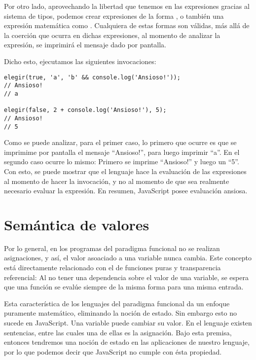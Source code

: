 Por otro lado, aprovechando la libertad que tenemos en las expresiones gracias al sistema de tipos, podemos crear expresiones de la forma , o también una expresión matemática como . Cualquiera de estas formas son válidas, más allá de la coerción que ocurra en dichas expresiones, al momento de analizar la expresión, se imprimirá el mensaje dado por pantalla.

Dicho esto, ejecutamos las siguientes invocaciones:

\begin{lstlisting}[title={Analizando resultados de las invocaciones}]
elegir(true, 'a', 'b' && console.log('Ansioso!'));
// Ansioso!
// a

elegir(false, 2 + console.log('Ansioso!'), 5);
// Ansioso!
// 5
\end{lstlisting}

Como se puede analizar, para el primer caso, lo primero que ocurre es que se imprimime por pantalla el mensaje "`Ansioso!"', para luego imprimir "`a"'. En el segundo caso ocurre lo mismo: Primero se imprime "`Ansioso!"' y luego un "`5"'. Con esto, se puede mostrar que el lenguaje hace la evaluación de las expresiones al momento de hacer la invocación, y no al momento de que sea realmente necesario evaluar la expresión. En resumen, JavaScript posee evaluación ansiosa.

\section{Semántica de valores}

Por lo general, en los programas del paradigma funcional no se realizan asignaciones, y así, el valor asoaciado a una variable nunca cambia. Este concepto está directamente relacionado con el de funciones puras y transparencia referencial: Al no tener una dependencia sobre el valor de una variable, se espera que una función se evalúe siempre de la misma forma para una misma entrada.

Esta característica de los lenguajes del paradigma funcional da un enfoque puramente matemático, eliminando la noción de estado. Sin embargo esto no sucede en JavaScript. Una variable puede cambiar su valor. En el lenguaje existen sentencias, entre las cuales una de ellas es la asignación. Bajo esta premisa, entonces tendremos una noción de estado en las aplicaciones de nuestro lenguaje, por lo que podemos decir que JavaScript no cumple con ésta propiedad.

